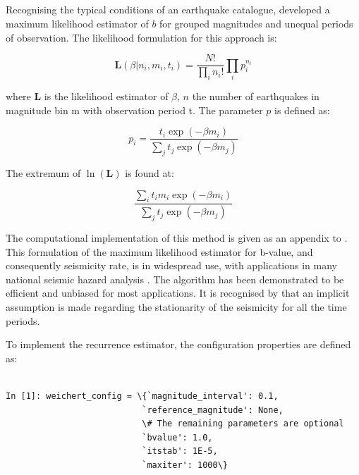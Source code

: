 \subsection{\cite{Weichert1980}}

Recognising the typical conditions of an earthquake catalogue, \cite{Weichert1980} developed a maximum likelihood estimator of $b$ for grouped magnitudes and unequal periods of observation. The likelihood formulation for this approach is:

\begin{equation}
   \mathbf{L} \left( {\beta | n_i, m_i, t_i} \right) = \frac{ N!}{\prod_i n_i!} \prod_i p_{i}^{n_i}
\end{equation}

where $\mathbf{L}$ is the likelihood estimator of $\beta$, $n$ the number of earthquakes in magnitude bin m with observation period t. The parameter $p$ is defined as:

\begin{equation}
   p_i = \frac{t_i \exp \left( {-\beta m_i} \right) }{\sum_j t_j \exp \left( {-\beta m_j} \right)}
\end{equation}

The extremum of $\ln \left( {\mathbf{L}}\right)$ is found at:

\begin{equation} 
   \frac{\sum_i t_i m_i \exp \left( {-\beta m_i} \right)}{\sum_j t_j \exp \left( {-\beta m_j} \right)}
\end{equation}

The computational implementation of this method is given as an appendix to \cite{Weichert1980}. This formulation of the maximum likelihood estimator for b-value, and consequently seismicity rate, is in widespread use, with applications in many national seismic hazard analysis \citep[e.g.][]{usgsNSHM1996,usgsNSHM2002}. The algorithm has been demonstrated to be efficient and unbiased for most applications. It is recognised by \citet{Felzer2008} that an implicit assumption is made regarding the stationarity of the seismicity for all the time periods. 

To implement the \cite{Weichert1980} recurrence estimator, the configuration properties are defined as:

\begin{Verbatim}[frame=single, commandchars=\\\{\}, fontsize=\scriptsize]

In [1]: weichert_config = \{`magnitude_interval': 0.1,
                           `reference_magnitude': None,
                           \# The remaining parameters are optional
                           `bvalue': 1.0,
                           `itstab': 1E-5,
                           `maxiter': 1000\}

\end{Verbatim}

